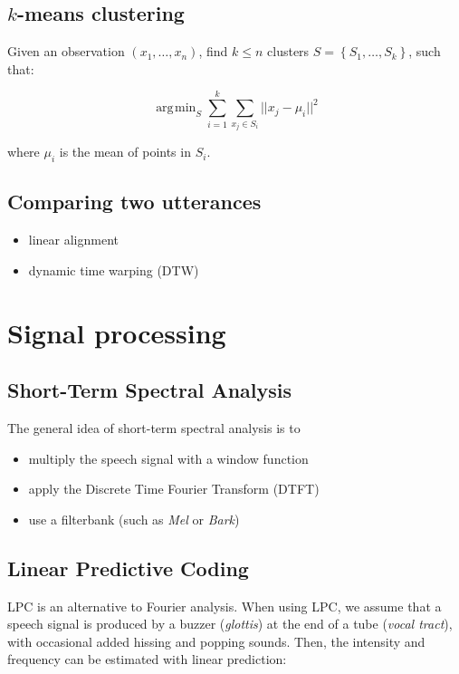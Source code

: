 \documentclass[11pt]{article}
\DeclareMathOperator*{\argmin}{\arg\!\min}
\begin{document}
\subsection{$k$-means clustering}

Given an observation $(x_1, \ldots, x_n)$, find $k \leq n$ clusters $S = \left\{S_1, \ldots, S_k\right\}$, such that:

\[
    \argmin_S \sum\limits_{i = 1}^k \sum\limits_{x_j \in S_i} ||x_j - \mu_i||^2
\]

where $\mu_i$ is the mean of points in $S_i$.

\subsection{Comparing two utterances}

\begin{itemize}
    \item linear alignment
    \item dynamic time warping (DTW)
\end{itemize}

\section{Signal processing}

\subsection{Short-Term Spectral Analysis}

The general idea of short-term spectral analysis is to

\begin{itemize}
    \item multiply the speech signal with a window function
    \item apply the Discrete Time Fourier Transform (DTFT)
    \item use a filterbank (such as \textit{Mel} or \textit{Bark})
\end{itemize}

\subsection{Linear Predictive Coding}

LPC is an alternative to Fourier analysis. When using LPC, we assume that a speech signal is produced by a buzzer (\textit{glottis}) at the end of a tube (\textit{vocal tract}), with occasional added hissing and popping sounds. Then, the intensity and frequency can be estimated with linear prediction:
\end{document}

